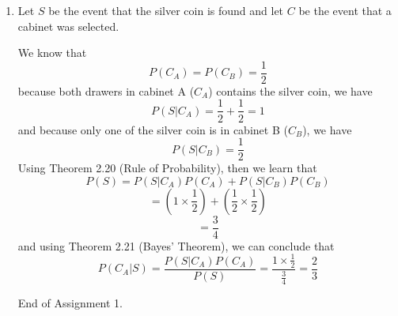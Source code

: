 \documentclass[12pt]{article}
\begin{document}
\begin{enumerate}
\begin{proof}
	We will now substitute $(\triangle)$ into $(\Theta)$  where we will have
	$$P(A^{c} \cap B) = P(B) - P(A)P(B)$$
	$$P(A^{c} \cap B) = P(B)(1 - P(A)) \qquad (\vert)$$
	and by Theorem 2.19 (Complement Rule), we learn that
	$$(1 - P(A)) = P(A^{c})$$
	then this equation,
	$$P(A^{c} \cap B) = P(A^{c})P(B)$$
	is identical to $(\vert)$. Hence we have proven that 
	
	$$A \text{ and } B \text{ are independent } \Rightarrow A^{c} \text{ and } B \text{ are independent.}$$ 

	``$\Leftarrow$": Now, since $A^c$ and $B$ are independent, we have:
	$$P(A^c \cap B) = P(A^c)P(B) \qquad (\phi)$$ 
	by Definition 2.18 (independence). This proof is trivial as it follows the same structure as the last one I did.
	Now we want to show that:
	$$P(A \cap B) = P(A)P(B)$$
	We know that:
	$$P(B) = P(A^{c} \cap B) + P(A \cap B) \qquad (\gamma)$$ 
	because the probability of $B$, is the same as probability of $A$ and $B$ happening added with probability of $\neg A$ and $B$. We then also learn that:
	$$P(A \cap B) = P(B) - P(A^c \cap B) \qquad (\Gamma)$$
	by rearranging $(\gamma)$. 
	
	We will now substitute $(\phi)$ into $(\Gamma)$  where we will have
	$$P(A \cap B) = P(B) - P(A^c)P(B)$$
	$$P(A \cap B) = P(B)(1 - P(A^c)) \qquad (\psi)$$
	and by Theorem 2.19 (Complement Rule), we learn that
	$$(1 - P(A^c)) = P(A)$$
	then this equation,
	$$P(A \cap B) = P(A)P(B)$$
	is identical to $(\psi)$. Hence we have proven that 
	$$A^{c} \text{ and } B \text{ are independent } \Rightarrow A \text{ and } B \text{ are independent.} $$ 
	Therefore, We have proven that $A$ and $B$ are independent $\Leftrightarrow$ $A^c$ and $B$ are independent. \qedhere 
	\end{proof}
	
	\item Let $S$ be the event that the silver coin is found and let $C$ be the event that a cabinet was selected.

	We know that
	$$P(C_A) = P(C_B) = \frac{1}{2}$$
	because both drawers in cabinet A ($C_A$) contains the silver coin, we have 
	$$P(S|C_A) = \frac{1}{2} + \frac{1}{2} = 1$$
	and because only one of the silver coin is in cabinet B ($C_B$), we have
	$$P(S|C_B) = \frac{1}{2}$$
	Using Theorem 2.20 (Rule of Probability), then we learn that 
	$$P(S) = P(S|C_A)P(C_A) + P(S|C_B)P(C_B)$$
	$$= (1 \times \frac{1}{2}) + (\frac{1}{2} \times \frac{1}{2})$$
	$$= \frac{3}{4}$$
	and using Theorem 2.21 (Bayes' Theorem), we can conclude that
	$$P(C_A|S) = \frac{P(S|C_A)P(C_A)}{P(S)} = \frac{1 \times \frac{1}{2}}{\frac{3}{4}} = \frac{2}{3}$$
	
	End of Assignment 1.
	
	
	
	
	
	
	
\end{enumerate}
\end{document}
